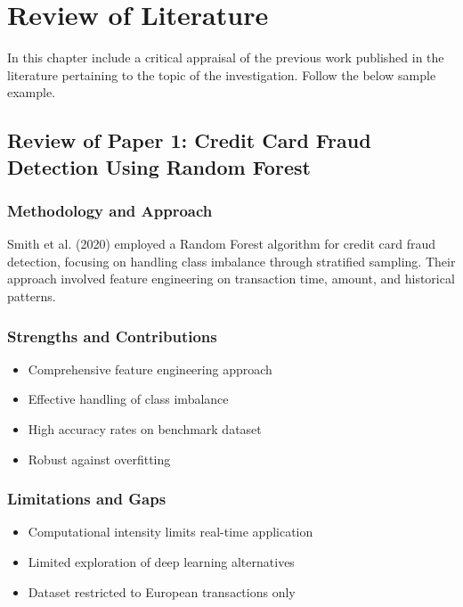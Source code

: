 \chapter{Review of Literature}
In this chapter include a critical appraisal of the previous work published in the literature pertaining to the topic of the investigation. Follow the below sample example.

\section{Review of Paper 1: Credit Card Fraud Detection Using Random Forest}


\subsection*{Methodology and Approach}
Smith et al. (2020) employed a Random Forest algorithm for credit card fraud detection, focusing on handling class imbalance through stratified sampling. Their approach involved feature engineering on transaction time, amount, and historical patterns.

\subsection*{Strengths and Contributions}
\begin{itemize}
\item Comprehensive feature engineering approach
\item Effective handling of class imbalance
\item High accuracy rates on benchmark dataset
\item Robust against overfitting
\end{itemize}

\subsection*{Limitations and Gaps}
\begin{itemize}
\item Computational intensity limits real-time application
\item Limited exploration of deep learning alternatives
\item Dataset restricted to European transactions only
\end{itemize}

